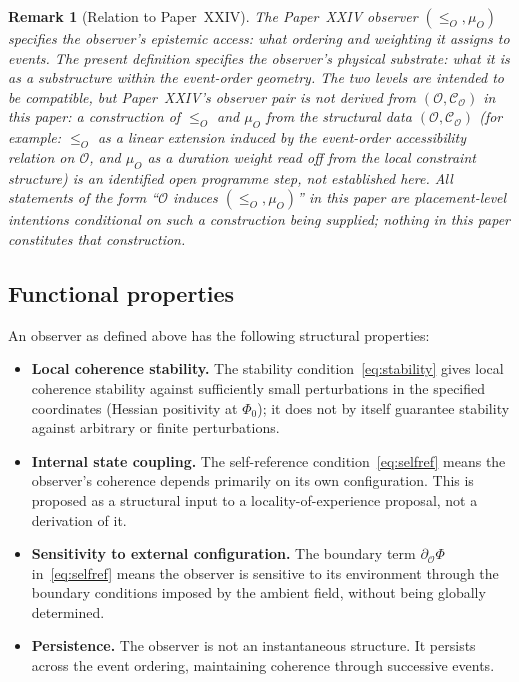 \documentclass[12pt]{article}
\newtheorem{remark}[theorem]{Remark}
\newcommand{\Ocal}{\mathcal{O}}
\newcommand{\Ccal}{\mathcal{C}}
\begin{document}
\begin{remark}[Relation to Paper~XXIV]\label{rem:xxiv_bridge}
The Paper~XXIV observer $(\leq_O, \mu_O)$ specifies the observer's \textit{epistemic access}: what ordering and weighting it assigns to events. The present definition specifies the observer's \textit{physical substrate}: what it is as a substructure within the event-order geometry. The two levels are \emph{intended to be compatible}, but Paper~XXIV's observer pair is \emph{not} derived from $(\Ocal, \Ccal_\Ocal)$ in this paper: a construction of $\leq_O$ and $\mu_O$ from the structural data $(\Ocal, \Ccal_\Ocal)$ (for example: $\leq_O$ as a linear extension induced by the event-order accessibility relation on $\Ocal$, and $\mu_O$ as a duration weight read off from the local constraint structure) is an identified open programme step, not established here. All statements of the form ``$\Ocal$ induces $(\leq_O, \mu_O)$'' in this paper are placement-level intentions conditional on such a construction being supplied; nothing in this paper constitutes that construction.
\end{remark}

\subsection{Functional properties}

An observer as defined above has the following structural properties:

\begin{itemize}
    \item \textbf{Local coherence stability.} The stability condition~\eqref{eq:stability} gives local coherence stability against sufficiently small perturbations in the specified coordinates (Hessian positivity at $\Phi_0$); it does not by itself guarantee stability against arbitrary or finite perturbations.
    \item \textbf{Internal state coupling.} The self-reference condition~\eqref{eq:selfref} means the observer's coherence depends primarily on its own configuration. This is proposed as a structural input to a locality-of-experience proposal, not a derivation of it.
    \item \textbf{Sensitivity to external configuration.} The boundary term $\partial_\Ocal \Phi$ in~\eqref{eq:selfref} means the observer is sensitive to its environment through the boundary conditions imposed by the ambient field, without being globally determined.
    \item \textbf{Persistence.} The observer is not an instantaneous structure. It persists across the event ordering, maintaining coherence through successive events.
\end{itemize}
\end{document}
